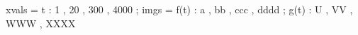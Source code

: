\documentclass[12pt]{article}
\begin{document}
\begin{functable}
    xvals =    t : 1 , 20 , 300 , 4000 ;
    imgs  = f(t) : a , bb , ccc , dddd ;
            g(t) : U , VV , WWW , XXXX
\end{functable}
\end{document}
